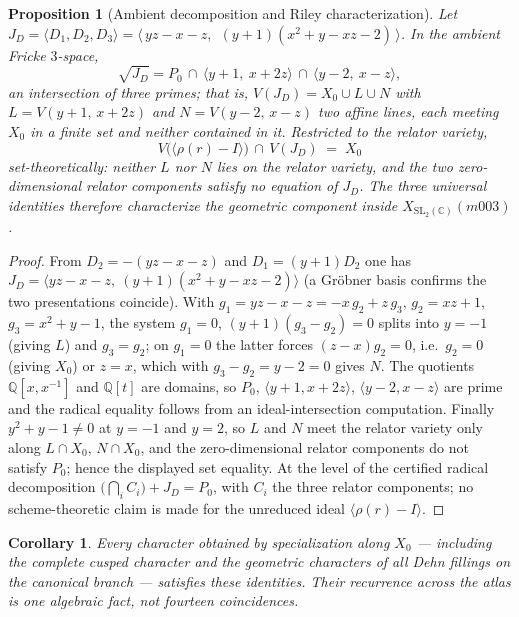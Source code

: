 \documentclass[11pt,a4paper]{article}
\newtheorem{proposition}[theorem]{Proposition}
\newtheorem{corollary}[theorem]{Corollary}
\theoremstyle{definition}
\theoremstyle{remark}
\newcommand{\SLtwo}{\mathrm{SL}_2(\mathbb{C})}
\newcommand{\Q}{\mathbb{Q}}
\begin{document}
\begin{proposition}[Ambient decomposition and Riley characterization]
\label{prop:jd}
Let $J_D = \langle D_1, D_2, D_3\rangle
= \langle\, yz - x - z,\ \ (y+1)(x^2 + y - xz - 2)\,\rangle$. In the
ambient Fricke $3$-space,
\begin{equation}
\sqrt{J_D}
= P_0 \,\cap\, \langle y+1,\ x+2z\rangle
      \,\cap\, \langle y-2,\ x-z\rangle ,
\end{equation}
an intersection of three primes; that is, $V(J_D) = X_0 \cup L \cup N$
with $L = V(y+1,\,x+2z)$ and $N = V(y-2,\,x-z)$ two affine lines, each
meeting $X_0$ in a finite set and neither contained in it. Restricted
to the relator variety,
\begin{equation}
V\bigl(\langle \rho(r) - I\rangle\bigr) \,\cap\, V(J_D) \;=\; X_0
\end{equation}
set-theoretically: neither $L$ nor $N$ lies on the relator variety,
and the two zero-dimensional relator components satisfy no equation of
$J_D$. The three universal identities therefore characterize the
geometric component inside $X_{\SLtwo}(m003)$.
\end{proposition}

\begin{proof}
From $D_2 = -(yz-x-z)$ and $D_1 = (y+1)D_2$ one has
$J_D = \langle yz-x-z,\ (y+1)(x^2+y-xz-2)\rangle$ (a Gr\"obner basis
confirms the two presentations coincide). With
$g_1 = yz-x-z = -x\,g_2 + z\,g_3$, $g_2 = xz+1$, $g_3 = x^2+y-1$, the
system $g_1 = 0$, $(y+1)(g_3-g_2) = 0$ splits into $y=-1$ (giving $L$)
and $g_3 = g_2$; on $g_1=0$ the latter forces $(z-x)g_2 = 0$, i.e.\
$g_2 = 0$ (giving $X_0$) or $z = x$, which with $g_3-g_2 = y-2 = 0$
gives $N$. The quotients $\Q[x,x^{-1}]$ and $\Q[t]$ are domains, so
$P_0$, $\langle y+1,x+2z\rangle$, $\langle y-2,x-z\rangle$ are prime
and the radical equality follows from an ideal-intersection
computation. Finally $y^2+y-1 \neq 0$ at $y = -1$ and $y = 2$, so $L$
and $N$ meet the relator variety only along $L \cap X_0$,
$N \cap X_0$, and the zero-dimensional relator components do not
satisfy $P_0$; hence the displayed set equality. At the level of the
certified radical decomposition
$\bigl(\bigcap_i C_i\bigr) + J_D = P_0$, with $C_i$ the three relator
components; no scheme-theoretic claim is made for the unreduced ideal
$\langle \rho(r) - I\rangle$.
\end{proof}

\begin{corollary}
Every character obtained by specialization along $X_0$ --- including
the complete cusped character and the geometric characters of all
Dehn fillings on the canonical branch --- satisfies these identities.
Their recurrence across the atlas is one algebraic fact, not fourteen
coincidences.
\end{corollary}
\end{document}
